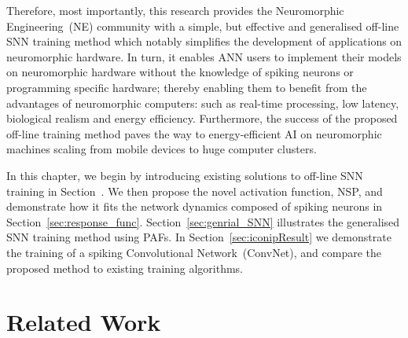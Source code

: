 Therefore, most importantly, this research provides the Neuromorphic Engineering~(NE) community with a simple, but effective and generalised off-line SNN training method which notably simplifies the development of \DIFdelbegin {}\DIFdelend \DIFaddbegin {}\DIFaddend applications on neuromorphic hardware.
In turn, it enables ANN users to implement their models on neuromorphic hardware without the knowledge of spiking neurons or programming specific hardware;
thereby enabling them to benefit from the advantages of neuromorphic computers: such as real-time processing, low latency, biological realism and energy efficiency.
Furthermore, the success of the proposed off-line training method paves the way to energy-efficient AI on neuromorphic machines scaling from mobile devices to huge computer clusters.



In this chapter, we begin by introducing existing solutions to off-line SNN training in Section~\DIFdelbegin \DIFdel{\ref{sec:intro_NSP}}\DIFdelend \DIFaddbegin \DIFadd{\ref{sec:NSP_relate}}\DIFaddend .
We then propose the novel activation function, NSP, and demonstrate how it fits the network dynamics composed of spiking neurons in Section~\ref{sec:response_func}.
Section~\ref{sec:genrial_SNN} illustrates the generalised SNN training method using PAFs.
In Section~\ref{sec:iconipResult} we demonstrate the training of a spiking Convolutional Network~(ConvNet), and compare the proposed method to existing training algorithms.

\section{Related Work}
\label{sec:NSP_relate}

